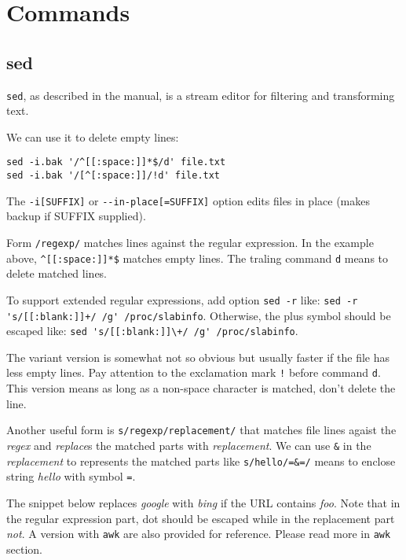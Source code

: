 \section{Commands}
\label{sec:bash-commands}

\subsection{sed}
\label{sec:bash-sed}

\lstinline|sed|, as described in the manual, is a stream editor
for filtering and transforming text.

We can use it to delete empty lines:

\begin{lstlisting}
sed -i.bak '/^[[:space:]]*$/d' file.txt
sed -i.bak '/[^[:space:]]/!d' file.txt
\end{lstlisting}

The \lstinline|-i[SUFFIX]| or \lstinline|--in-place[=SUFFIX]|
option edits files in place (makes backup if SUFFIX supplied).

Form \lstinline|/regexp/| matches lines against the regular
expression. In the example above,
\lstinline|^[[:space:]]*$| matches empty lines. The traling
command \lstinline|d| means to delete matched lines.

To support extended regular expressions, add option
\lstinline|sed -r| like:
\lstinline|sed -r 's/[[:blank:]]+/ /g' /proc/slabinfo|. Otherwise,
the plus symbol should be escaped like:
\lstinline|sed 's/[[:blank:]]\+/ /g' /proc/slabinfo|.

The variant version is somewhat not so obvious but usually faster
if the file has less empty lines. Pay attention to the exclamation
mark \lstinline|!| before command \lstinline|d|. This version
means as long as a non-space character is matched, don't delete
the line.

Another useful form is \lstinline|s/regexp/replacement/| that
matches file lines agaist the \textit{regex} and \textit{replace}s
the matched parts with \textit{replacement}. We can use
\lstinline|&| in the \textit{replacement} to represents the
matched parts like \lstinline|s/hello/=&=/| means to enclose
string \textit{hello} with symbol \verb|=|.

The snippet below replaces \textit{google} with \textit{bing} if
the URL contains \textit{foo}. Note that in the regular expression
part, dot should be escaped while in the replacement part
\textit{not}. A version with \lstinline|awk| are also provided for
reference. Please read more in \verb|awk| section.

